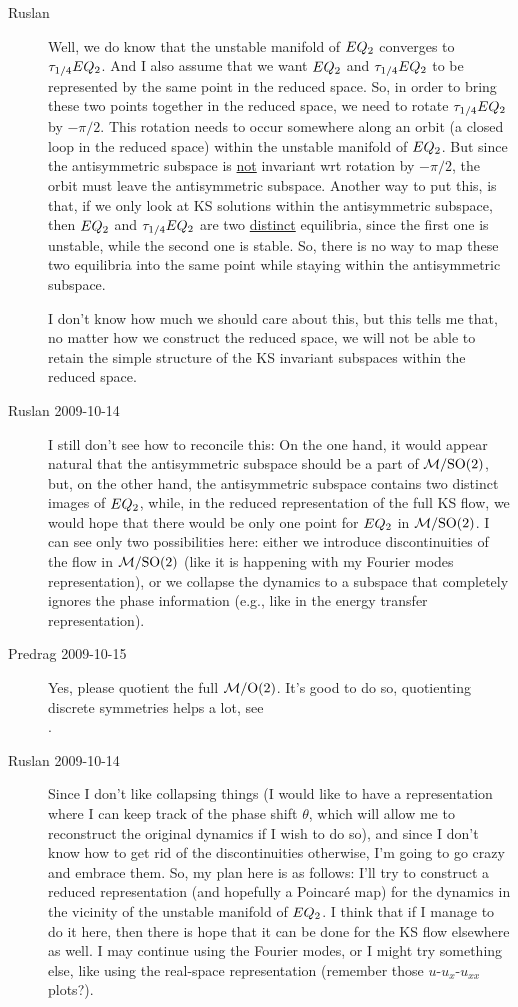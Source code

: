 \begin{description}
\item[Ruslan]
Well, we do know that the unstable manifold of $EQ_{2}$
converges to $\tau_{1/4}EQ_{2}$.  And I also assume that we
want $EQ_{2}$ and $\tau_{1/4}EQ_{2}$ to be represented by
the same point in the reduced space.  So, in order to bring
these two points together in the reduced space, we need to
rotate $\tau_{1/4}EQ_{2}$ by $-\pi/2$.  This rotation needs
to occur somewhere along an orbit (a closed loop in the
reduced space) within the unstable manifold of $EQ_{2}$.
But since the antisymmetric subspace is \underline{not}
invariant wrt rotation by $-\pi/2$, the orbit must leave the
antisymmetric subspace.  Another way to put this, is that, if
we only look at KS solutions within the antisymmetric
subspace, then $EQ_{2}$ and $\tau_{1/4}EQ_{2}$ are two
\underline{distinct} equilibria, since the first one is
unstable, while the second one is stable.  So, there is no
way to map these two equilibria into the same point while
staying within the antisymmetric subspace.

I don't know how much we should care about this, but this
tells me that, no matter how we construct the reduced space,
we will not be able to retain the simple structure of the KS
invariant subspaces within the reduced space.

\item[Ruslan 2009-10-14]
I still don't see how to reconcile this: On the one hand, it
would appear natural that the antisymmetric subspace should
be a part of ${\cal M}/\textrm{SO}(2)$, but, on the other hand, the
antisymmetric subspace contains two distinct images of
$EQ_{2}$, while, in the reduced representation of the full
KS flow, we would hope that there would be only one point for
$EQ_{2}$ in ${\cal M}/\textrm{SO}(2)$.  I can see only two possibilities
here: either we introduce discontinuities of the flow in
${\cal M}/\textrm{SO}(2)$ (like it is happening with my Fourier modes
representation), or we collapse the dynamics to a subspace
that completely ignores the phase information (e.g., like in
the energy transfer representation).

\item[Predrag 2009-10-15]
Yes, please quotient the full ${\cal M}/\textrm{O}(2)$. It's good to do so,
quotienting discrete symmetries helps a lot, see
\\
.

\item[Ruslan 2009-10-14]
Since I don't like collapsing things (I would like to have a
representation where I can keep track of the phase shift
$\theta$, which will allow me to reconstruct the original
dynamics if I wish to do so), and since I don't know how to
get rid of the discontinuities otherwise, I'm going to go
crazy and embrace them.  So, my plan here is as follows:
I'll try to construct a reduced representation (and hopefully
a Poincar\'e map) for the dynamics in the vicinity of the
unstable manifold of $EQ_{2}$. I think that if I manage to
do it here, then there is hope that it can be done for the KS
flow elsewhere as well.  I may continue using the Fourier
modes, or I might try something else, like using the
real-space representation (remember those $u$-$u_x$-$u_{xx}$
plots?).


\end{description}
